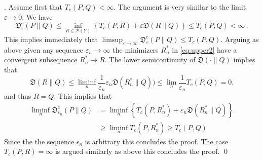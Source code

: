 \documentclass{amsart}
\theoremstyle{definition}
\theoremstyle{remark}
\numberwithin{equation}{section}
\begin{document}
.
Assume first that $T_c(P,Q)<\infty$.  The argument is very similar to the limit $\varepsilon \to 0$.
We have 
\begin{equation}\label{eq:upper2}
 \mathfrak{D}_{\varepsilon}^c(P\|Q) \le \inf_{R \in \mathcal{P}(Y)} \left\{ T_c(P,R) + \varepsilon \mathfrak{D}(R \|Q) \right\} \le 
T_c(P,Q) < \infty \,.
\end{equation}
This implies immediately that 
$
\limsup_{\varepsilon \to \infty}
\mathfrak{D}^{c}_{\varepsilon}(P\|Q) \le T_c(P,Q)
$.
Arguing as above given any sequence $\varepsilon_n \to \infty$ the minimizers $R_n^*$
in \eqref{eq:upper2} have a convergent subsequence $R_n^* \to R$.  The lower semicontinuity of $\mathfrak{D}(\cdot\|Q)$ implies 
that 
\begin{equation}\label{eq:einfty1}
\mathfrak{D}(R\|Q) \le \liminf_{n}\frac{1}{\varepsilon_n} \varepsilon_n \mathfrak{D}(R_n^*\|Q)) \le \lim_{n} \frac{1}{\varepsilon_n} T_c(P,Q) =0.
\end{equation}
and thus $R=Q$. This implies that 
\begin{equation}\label{eq:einfty2}
\begin{aligned}
\liminf_{n}  \mathfrak{D}^{c}_{\varepsilon_n}(P\|Q)& =
\liminf_{n}\left\{ T_c(P, R_n^*) +\varepsilon_n   \mathfrak{D}(R_n^* \|Q) \right\} \\
& \ge \liminf_{n}  T_c(P, R_n^*) \ge T_c(P,Q)
\end{aligned}
\end{equation}
Since the the sequence $\epsilon_n$ is arbitrary this concludes the proof.  The case $T_c(P,R)=\infty$ is argued similarly as above this concludes the proof. \qed
\end{document}
